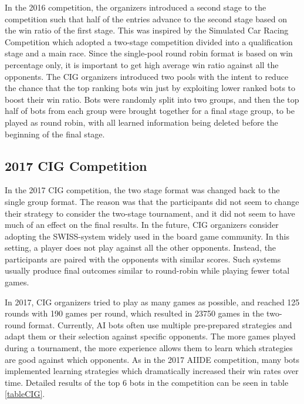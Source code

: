 In the 2016 competition, the organizers introduced a second stage to the competition such that half of the entries advance to the second stage based on the win ratio of the first stage. This was inspired by the Simulated Car Racing Competition \cite{loiacono20102009} which adopted a two-stage competition divided into a qualification stage and a main race. Since the single-pool round robin format is based on win percentage only, it is important to get high average win ratio against all the opponents. The CIG organizers introduced two pools with the intent to reduce the chance that the top ranking bots win just by exploiting lower ranked bots to boost their win ratio. Bots were randomly split into two groups, and then the top half of bots from each group were brought together for a final stage group, to be played as round robin, with all learned information being deleted before the beginning of the final stage. 

\subsection{2017 CIG Competition}\label{subsecCIGnews}


In the 2017 CIG competition, the two stage format was changed back to the single group format. The reason was that the participants did not seem to change their strategy to consider the two-stage tournament, and it did not seem to have much of an effect on the final results. In the future, CIG organizers consider adopting the SWISS-system widely used in the board game community. In this setting, a player does not play against all the other opponents. Instead, the participants are paired with the opponents with similar scores. Such systems usually produce final outcomes similar to round-robin while playing fewer total games. 

In 2017, CIG organizers tried to play as many games as possible, and reached 125 rounds with 190 games per round, which resulted in 23750 games in the two-round format. Currently, AI bots often use multiple pre-prepared strategies and adapt them or their selection against specific opponents. The more games played during a tournament, the more experience allows them to learn which strategies are good against which opponents. As in the 2017 AIIDE competition, many bots implemented learning strategies which dramatically increased their win rates over time. Detailed results of the top 6 bots in the competition can be seen in table \ref{tableCIG}.

